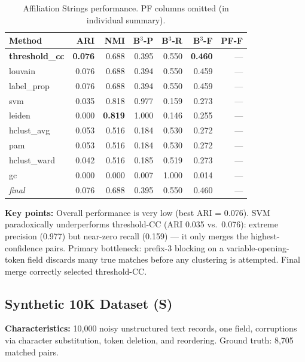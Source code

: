 \documentclass[11pt, a4paper]{article}
\newcommand{\good}[1]{{\color{good}\textbf{#1}}}
\newcommand{\na}{---}
\begin{document}
\begin{table}[h!]
\centering
\small
\setlength{\tabcolsep}{4pt}
\begin{tabular}{lrrrrrr}
\toprule
\textbf{Method} & \textbf{ARI} & \textbf{NMI} & \textbf{B$^3$-P} & \textbf{B$^3$-R} & \textbf{B$^3$-F} & \textbf{PF-F} \\
\midrule
\good{threshold\_cc} & \good{0.076} & 0.688 & 0.395 & 0.550 & \good{0.460} & \na \\
louvain              & 0.076 & 0.688 & 0.394 & 0.550 & 0.459 & \na \\
label\_prop          & 0.076 & 0.688 & 0.394 & 0.550 & 0.459 & \na \\
svm                  & 0.035 & 0.818 & 0.977 & 0.159 & 0.273 & \na \\
leiden               & 0.000 & \good{0.819} & 1.000 & 0.146 & 0.255 & \na \\
hclust\_avg          & 0.053 & 0.516 & 0.184 & 0.530 & 0.272 & \na \\
pam                  & 0.053 & 0.516 & 0.184 & 0.530 & 0.272 & \na \\
hclust\_ward         & 0.042 & 0.516 & 0.185 & 0.519 & 0.273 & \na \\
gc                   & 0.000 & 0.000 & 0.007 & 1.000 & 0.014 & \na \\
\midrule
\textit{final}       & 0.076 & 0.688 & 0.395 & 0.550 & 0.460 & \na \\
\bottomrule
\end{tabular}
\caption{Affiliation Strings performance. PF columns omitted (in individual summary).}
\end{table}

\textbf{Key points:} Overall performance is very low (best ARI = 0.076).
SVM paradoxically underperforms threshold-CC (ARI 0.035 vs.\ 0.076): extreme
precision (0.977) but near-zero recall (0.159) --- it only merges the highest-confidence
pairs. Primary bottleneck: prefix-3 blocking on a variable-opening-token field
discards many true matches before any clustering is attempted. Final merge
correctly selected threshold-CC.

\subsection{Synthetic 10K Dataset (S)}

\textbf{Characteristics:} 10,000 noisy unstructured text records, one field,
corruptions via character substitution, token deletion, and reordering.
Ground truth: 8,705 matched pairs.
\end{document}
